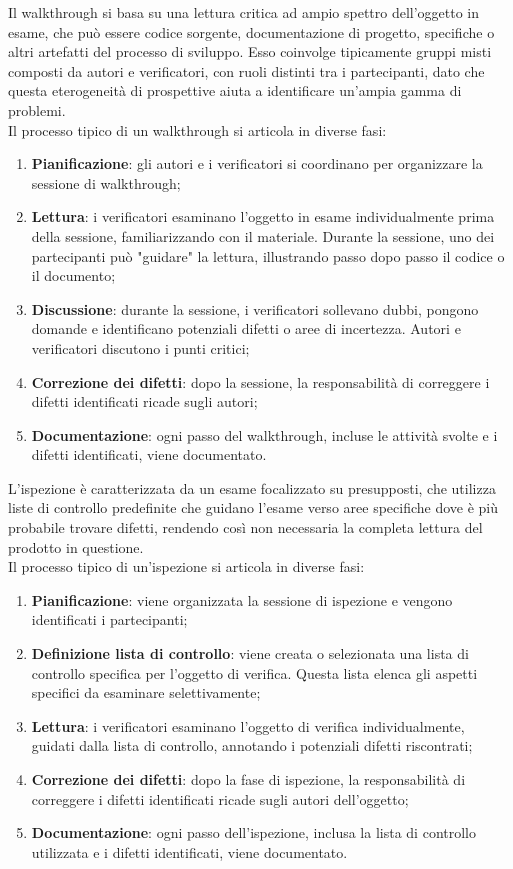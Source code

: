 Il walkthrough si basa su una lettura critica ad ampio spettro dell'oggetto in esame, che può essere codice sorgente, documentazione di progetto, specifiche o altri artefatti del processo di sviluppo. Esso coinvolge tipicamente gruppi misti composti da autori e verificatori, con ruoli distinti tra i partecipanti, dato che questa eterogeneità di prospettive aiuta a identificare un'ampia gamma di problemi. \\
Il processo tipico di un walkthrough si articola in diverse fasi:
\begin{enumerate}
    \item \textbf{Pianificazione}: gli autori e i verificatori si coordinano per organizzare la sessione di walkthrough;
    \item \textbf{Lettura}: i verificatori esaminano l'oggetto in esame individualmente prima della sessione, familiarizzando con il materiale. Durante la sessione, uno dei partecipanti può "guidare" la lettura, illustrando passo dopo passo il codice o il documento;
    \item \textbf{Discussione}: durante la sessione, i verificatori sollevano dubbi, pongono domande e identificano potenziali difetti o aree di incertezza. Autori e verificatori discutono i punti critici;
    \item \textbf{Correzione dei difetti}: dopo la sessione, la responsabilità di correggere i difetti identificati ricade sugli autori;
    \item \textbf{Documentazione}: ogni passo del walkthrough, incluse le attività svolte e i difetti identificati, viene documentato.
\end{enumerate}

L'ispezione è caratterizzata da un esame focalizzato su presupposti, che utilizza liste di controllo predefinite che guidano l'esame verso aree specifiche dove è più probabile trovare difetti, rendendo così non necessaria la completa lettura del prodotto in questione. \\
Il processo tipico di un'ispezione si articola in diverse fasi:
\begin{enumerate}
    \item \textbf{Pianificazione}: viene organizzata la sessione di ispezione e vengono identificati i partecipanti;
    \item \textbf{Definizione lista di controllo}: viene creata o selezionata una lista di controllo specifica per l'oggetto di verifica. Questa lista elenca gli aspetti specifici da esaminare selettivamente;
    \item \textbf{Lettura}: i verificatori esaminano l'oggetto di verifica individualmente, guidati dalla lista di controllo, annotando i potenziali difetti riscontrati;
    \item \textbf{Correzione dei difetti}: dopo la fase di ispezione, la responsabilità di correggere i difetti identificati ricade sugli autori dell'oggetto;
    \item \textbf{Documentazione}: ogni passo dell'ispezione, inclusa la lista di controllo utilizzata e i difetti identificati, viene documentato.
\end{enumerate}

